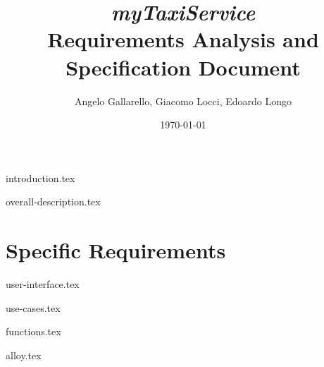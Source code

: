 \documentclass[12pt, a4paper]{article}
\begin{document}
\title{ \emph{ myTaxiService}\\ Requirements Analysis and Specification Document }

\author{Angelo Gallarello, Giacomo Locci, Edoardo Longo}
\date{\today}
\maketitle

\newpage

\tableofcontents

\newpage

{introduction.tex}

{overall-description.tex}

\newpage
\vfill
\section{Specific Requirements} %
\label{sec:specific_rquirements}

{user-interface.tex}

{use-cases.tex}

{functions.tex}


{alloy.tex}
\end{document}
